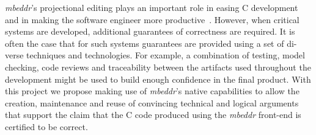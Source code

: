 \emph{mbeddr}’s projectional editing plays an important role in easing C development
and in making the software engineer more productive~\cite{VoelterRKS13}.
However, when critical systems are developed, additional guarantees of correctness are required. It is
often the case that for such systems guarantees are provided using a set of di-
verse techniques and technologies. For example, a combination of testing, model
checking, code reviews and traceability between the artifacts used throughout
the development might be used to build enough confidence in the final product.
With this project we propose making use of \emph{mbeddr}’s native capabilities to allow
the creation, maintenance and reuse of convincing technical and logical
arguments that support the claim that the C code produced using the \emph{mbeddr}
front-end is certified to be correct.